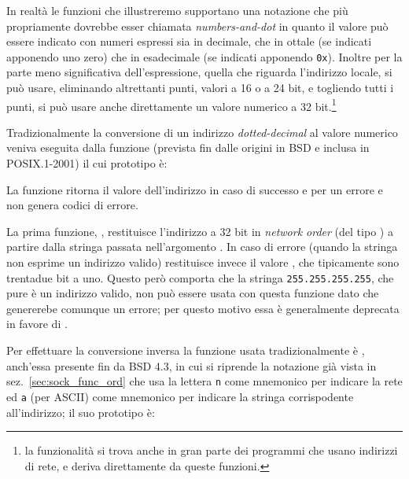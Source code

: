 In realtà le funzioni che illustreremo supportano una notazione che più
propriamente dovrebbe esser chiamata \textit{numbers-and-dot} in quanto il
valore può essere indicato con numeri espressi sia in decimale, che in ottale
(se indicati apponendo uno zero) che in esadecimale (se indicati apponendo
\texttt{0x}). Inoltre per la parte meno significativa dell'espressione, quella
che riguarda l'indirizzo locale, si può usare, eliminando altrettanti punti,
valori a 16 o a 24 bit, e togliendo tutti i punti, si può usare anche
direttamente un valore numerico a 32 bit.\footnote{la funzionalità si trova
  anche in gran parte dei programmi che usano indirizzi di rete, e deriva
  direttamente da queste funzioni.}

Tradizionalmente la conversione di un indirizzo \textit{dotted-decimal} al
valore numerico veniva eseguita dalla funzione  (prevista
fin dalle origini in BSD e inclusa in POSIX.1-2001) il cui prototipo è:

\begin{funcproto}{
}

{La funzione ritorna il valore dell'indirizzo in caso di successo e
   per un errore e non genera codici di errore.}
\end{funcproto}

La prima funzione, , restituisce l'indirizzo a 32 bit in
\textit{network order} (del tipo ) a partire dalla stringa
passata nell'argomento . In caso di errore (quando la stringa
non esprime un indirizzo valido) restituisce invece il valore
, che tipicamente sono trentadue bit a uno.  Questo però
comporta che la stringa \texttt{255.255.255.255}, che pure è un indirizzo
valido, non può essere usata con questa funzione dato che genererebe comunque
un errore; per questo motivo essa è generalmente deprecata in favore di
.

Per effettuare la conversione inversa la funzione usata tradizionalmente è
, anch'essa presente fin da BSD 4.3, in cui si riprende la
notazione già vista in sez.~\ref{sec:sock_func_ord} che usa la lettera
\texttt{n} come mnemonico per indicare la rete ed \texttt{a} (per ASCII) come
mnemonico per indicare la stringa corrispodente all'indirizzo; il suo
prototipo è:

